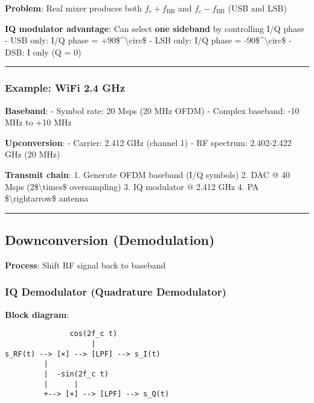 \textbf{Problem}: Real mixer produces both \(f_c + f_{\text{BB}}\) and
\(f_c - f_{\text{BB}}\) (USB and LSB)

\textbf{IQ modulator advantage}: Can select \textbf{one sideband} by
controlling I/Q phase - USB only: I/Q phase =
+90\$\^{}\textbackslash circ\$ - LSB only: I/Q phase =
-90\$\^{}\textbackslash circ\$ - DSB: I only (Q = 0)

\begin{center}\rule{0.5\linewidth}{0.5pt}\end{center}

\subsubsection{Example: WiFi 2.4 GHz}\label{example-wifi-2.4-ghz}

\textbf{Baseband}: - Symbol rate: 20 Msps (20 MHz OFDM) - Complex
baseband: -10 MHz to +10 MHz

\textbf{Upconversion}: - Carrier: 2.412 GHz (channel 1) - RF spectrum:
2.402-2.422 GHz (20 MHz)

\textbf{Transmit chain}: 1. Generate OFDM baseband (I/Q symbols) 2. DAC
@ 40 Msps (2\$\textbackslash times\$ oversampling) 3. IQ modulator @
2.412 GHz 4. PA \$\textbackslash rightarrow\$ antenna

\begin{center}\rule{0.5\linewidth}{0.5pt}\end{center}

\subsection{Downconversion
(Demodulation)}\label{downconversion-demodulation}

\textbf{Process}: Shift RF signal back to baseband

\subsubsection{IQ Demodulator (Quadrature
Demodulator)}\label{iq-demodulator-quadrature-demodulator}

\textbf{Block diagram}:

\begin{verbatim}
               cos(2f_c t)
                    |
s_RF(t) --> [×] --> [LPF] --> s_I(t)
         |
         |  -sin(2f_c t)
         |      |
         +--> [×] --> [LPF] --> s_Q(t)
\end{verbatim}

